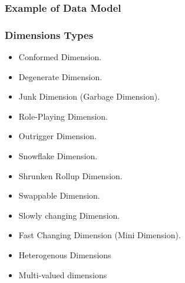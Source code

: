 \begin{frame}
    \frametitle{Example of Data Model}

    
\end{frame}

\begin{frame}
\frametitle{Dimensions Types}
	\begin{itemize}[<+->]
		\item Conformed Dimension.
		\item Degenerate Dimension.
		\item Junk Dimension (Garbage Dimension).
		\item Role-Playing Dimension.
		\item Outrigger Dimension.
		\item Snowflake Dimension.
		\item Shrunken Rollup Dimension.
		\item Swappable Dimension.
		\item Slowly changing Dimension.
		\item Fast Changing Dimension (Mini Dimension).
		\item Heterogenous Dimensions
		\item Multi-valued dimensions
	\end{itemize}
\end{frame}

